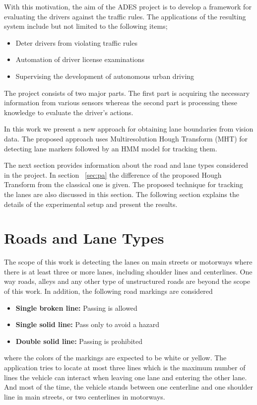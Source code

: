 \documentclass[a4paper,oneside,10pt]{article}
\begin{document}
With this motivation, the aim of the ADES project is to develop a framework for evaluating the drivers against the traffic rules. The applications of the resulting system include but not limited to the following items;

\begin{itemize}
    \item Deter drivers from violating traffic rules
    \item Automation of driver license examinations
    \item Supervising the development of autonomous urban driving
\end{itemize}

\noindent The project consists of two major parts. The first part is acquiring the necessary information from various sensors whereas the second part is processing these knowledge to evaluate the driver's actions. 

In this work we present a new approach for obtaining lane boundaries from vision data. The proposed approach uses Multiresolution Hough Transform (MHT) for detecting lane markers followed by an HMM model for tracking them. 

The next section provides information about the road and lane types considered in the project. In  section ~\ref{sec:pa} the difference of the proposed Hough Transform from the classical one is given. The proposed technique for tracking the lanes are also discussed in this section. The following section explains the details of the experimental setup and present the results.

\section {Roads and Lane Types}

The scope of this work is detecting the lanes on main streets or motorways where there is at least three or more lanes, including shoulder lines and centerlines. One way roads, alleys and any other type of unstructured roads are beyond the scope of this work. In addition, the following road markings are considered
\begin{itemize}
    \item {\bf Single broken line:} Passing is allowed
    \item {\bf Single solid line:} Pass only to avoid a hazard
    \item {\bf Double solid line:} Passing is prohibited
\end{itemize}
\noindent where the colors of the markings are expected to be white or yellow. The application tries to locate at most three lines which is the maximum number of lines the vehicle can interact when leaving one lane and entering the other lane. And most of the time, the vehicle stands between one centerline and one shoulder line in main streets, or two centerlines in motorways.
\end{document}
